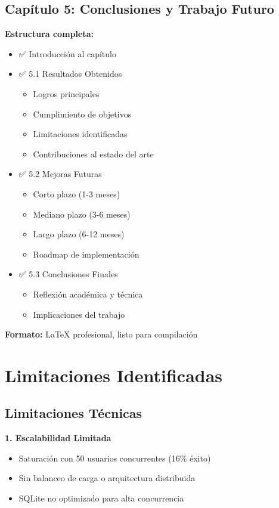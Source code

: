 \documentclass[12pt,a4paper]{article}
\begin{document}
\subsection{Capítulo 5: Conclusiones y Trabajo Futuro}

\textbf{Estructura completa:}
\begin{itemize}
    \item ✅ Introducción al capítulo
    \item ✅ 5.1 Resultados Obtenidos
    \begin{itemize}
        \item Logros principales
        \item Cumplimiento de objetivos
        \item Limitaciones identificadas
        \item Contribuciones al estado del arte
    \end{itemize}
    \item ✅ 5.2 Mejoras Futuras
    \begin{itemize}
        \item Corto plazo (1-3 meses)
        \item Mediano plazo (3-6 meses)
        \item Largo plazo (6-12 meses)
        \item Roadmap de implementación
    \end{itemize}
    \item ✅ 5.3 Conclusiones Finales
    \begin{itemize}
        \item Reflexión académica y técnica
        \item Implicaciones del trabajo
    \end{itemize}
\end{itemize}

\textbf{Formato:} LaTeX profesional, listo para compilación

\section{Limitaciones Identificadas}

\subsection{Limitaciones Técnicas}

\textbf{1. Escalabilidad Limitada}
\begin{itemize}
    \item Saturación con 50 usuarios concurrentes (16\% éxito)
    \item Sin balanceo de carga o arquitectura distribuida
    \item SQLite no optimizado para alta concurrencia
\end{itemize}
\end{document}
